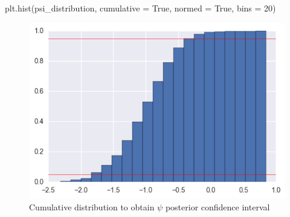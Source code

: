 \documentclass[a4paper,10pt]{article}
\theoremstyle{definition}
\begin{document}
\begin{enumerate}
\begin{enumerate}
\begin{python}
plt.hist(psi_distribution, cumulative = True, normed = True, bins = 20)

\end{python}

\begin{figure}[h]
\centering
\includegraphics[scale=1]{psiposteriorCI1.png}
\caption{Cumulative distribution to obtain $ \psi$ posterior confidence interval}
\end{figure}


\end{enumerate}
\end{enumerate}
\end{document}
